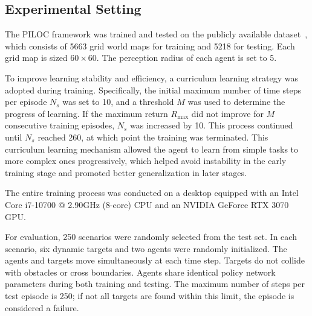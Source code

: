 \documentclass[lettersize,journal]{IEEEtran}
\begin{document}
\subsection{Experimental Setting}
The PILOC framework was trained and tested on the publicly available dataset~\cite{chen2019self}, which consists of 5663 grid world maps for training and 5218 for testing. Each grid map is sized \(60 \times 60\). The perception radius of each agent is set to 5.

To improve learning stability and efficiency, a curriculum learning strategy was adopted during training. Specifically, the initial maximum number of time steps per episode \( N_s \) was set to 10, and a threshold \( M \) was used to determine the progress of learning. If the maximum return \( R_{\text{max}} \) did not improve for \( M \) consecutive training episodes, \( N_s \) was increased by 10. This process continued until \( N_s \) reached 260, at which point the training was terminated. This curriculum learning mechanism allowed the agent to learn from simple tasks to more complex ones progressively, which helped avoid instability in the early training stage and promoted better generalization in later stages.

The entire training process was conducted on a desktop equipped with an Intel Core i7-10700 @ 2.90GHz (8-core) CPU and an NVIDIA GeForce RTX 3070 GPU.

For evaluation, 250 scenarios were randomly selected from the test set. In each scenario, six dynamic targets and two agents were randomly initialized. The agents and targets move simultaneously at each time step. Targets do not collide with obstacles or cross boundaries. Agents share identical policy network parameters during both training and testing. The maximum number of steps per test episode is 250; if not all targets are found within this limit, the episode is considered a failure.
\end{document}
